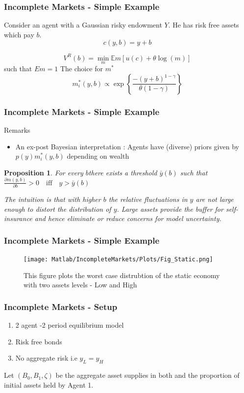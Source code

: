\documentclass{beamer}
\newtheorem{proposition}{Proposition}
\begin{document}
\begin{frame}
\frametitle{Incomplete Markets - Simple Example}
Consider an agent with a Gaussian risky endowment $Y$. He has risk
free assets which pay $b$. 
\[c(y,b)=y+b\]

\[V^R (b)=\min_{m}\mathbb{E}m[u(c)+\theta\log(m)]\]
such that 
$Em=1$
 The choice for $m^*$
\[m_i^*(y,b)\propto \exp\left\{\frac {-(y+b)^{1-\gamma}}{\theta(1-\gamma)}\right\}\]



\end{frame}


\begin{frame}
\frametitle{Incomplete Markets - Simple Example}

Remarks

\begin{itemize}
\item  An ex-post Bayesian interpretation : Agents have (diverse) priors
given by $p(y)m^*_i(y,b)$ depending on wealth
\end{itemize}
\begin{proposition}
For every $b$there exists a threshold $\bar{y}(b)$ such that $\frac{\partial m(y,b)}{\partial b} >0 \quad \text{iff} \quad  y>\bar{y}(b)$
\end{proposition}

 \emph{The intuition is that with higher $b$ the relative fluctuations in $y$ are not large enough to distort the distribution of $y$. Large assets provide the buffer for self-insurance and hence eliminate or reduce concerns for model uncertainty.}
\end{frame}



\begin{frame}
\frametitle{Incomplete Markets - Simple Example}
\begin{figure}[htbp]
\centering
	  \texttt{[image: Matlab/IncompleteMarkets/Plots/Fig\_Static.png]}

	\caption{This figure plots the worst case distrubtion of the
          static economy with two assets levels - Low and High}
	\label{fig:MPRPL}
\end{figure} 

\end{frame}

\begin{frame}
\frametitle{Incomplete Markets - Setup}
\begin{enumerate}
	\item 2 agent -2 period equilibrium model 
	\item Risk free bonds 
	\item No aggregate risk i.e $y_{L}=y_{H}$
	
\end{enumerate}
Let $(B_0,B_1,\zeta)$ be the aggregate asset supplies in both and the proportion of initial assets held by Agent 1.

\end{frame}
\end{document}
